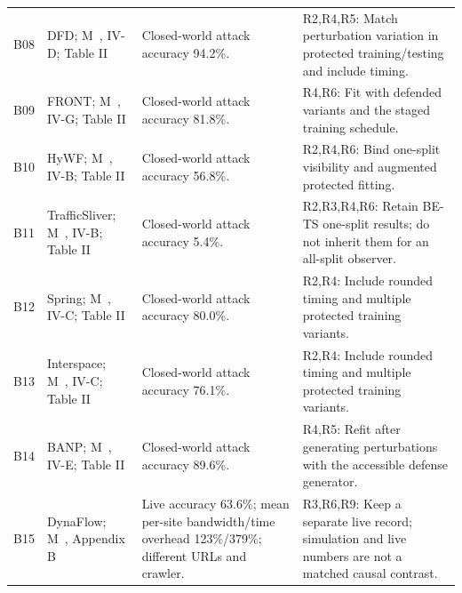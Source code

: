 {\begin{longtable}{@{}p{}p{}p{}p{}@{}}
B08 & DFD; M~\cite{mathews2023critical}, IV-D; Table II & Closed-world attack accuracy 94.2\%. & R2,R4,R5: Match perturbation variation in protected training/testing and include timing.\\
B09 & FRONT; M~\cite{mathews2023critical}, IV-G; Table II & Closed-world attack accuracy 81.8\%. & R4,R6: Fit with defended variants and the staged training schedule.\\
B10 & HyWF; M~\cite{mathews2023critical}, IV-B; Table II & Closed-world attack accuracy 56.8\%. & R2,R4,R6: Bind one-split visibility and augmented protected fitting.\\
B11 & TrafficSliver; M~\cite{mathews2023critical}, IV-B; Table II & Closed-world attack accuracy 5.4\%. & R2,R3,R4,R6: Retain BE-TS one-split results; do not inherit them for an all-split observer.\\
B12 & Spring; M~\cite{mathews2023critical}, IV-C; Table II & Closed-world attack accuracy 80.0\%. & R2,R4: Include rounded timing and multiple protected training variants.\\
B13 & Interspace; M~\cite{mathews2023critical}, IV-C; Table II & Closed-world attack accuracy 76.1\%. & R2,R4: Include rounded timing and multiple protected training variants.\\
B14 & BANP; M~\cite{mathews2023critical}, IV-E; Table II & Closed-world attack accuracy 89.6\%. & R4,R5: Refit after generating perturbations with the accessible defense generator.\\
B15 & DynaFlow; M~\cite{mathews2023critical}, Appendix B & Live accuracy 63.6\%; mean per-site bandwidth/time overhead 123\%/379\%; different URLs and crawler. & R3,R6,R9: Keep a separate live record; simulation and live numbers are not a matched causal contrast.\\
\end{longtable}}

